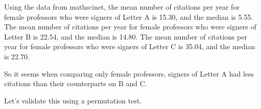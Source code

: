 \documentclass[]{article}
\newenvironment{Shaded}{\begin{snugshade}}{\end{snugshade}}
\newcommand{\DataTypeTok}[1]{\textcolor[rgb]{0.13,0.29,0.53}{#1}}
\newcommand{\KeywordTok}[1]{\textcolor[rgb]{0.13,0.29,0.53}{\textbf{#1}}}
\newcommand{\NormalTok}[1]{#1}
\newcommand{\OperatorTok}[1]{\textcolor[rgb]{0.81,0.36,0.00}{\textbf{#1}}}
\newcommand{\OtherTok}[1]{\textcolor[rgb]{0.56,0.35,0.01}{#1}}
\newcommand{\StringTok}[1]{\textcolor[rgb]{0.31,0.60,0.02}{#1}}
\begin{document}
Using the data from mathscinet, the mean number of citations per year
for female professors who were signers of Letter A is 15.30, and the
median is 5.55. The mean number of citations per year for female
professors who were signers of Letter B is 22.54, and the median is
14.80. The mean number of citations per year for female professors who
were signers of Letter C is 35.04, and the median is 22.70.

So it seems when comparing only female professors, signers of Letter A
had less citations than their counterparts on B and C.

Let's validate this using a permutation test.

\begin{Shaded}
\end{Shaded}
\end{document}
